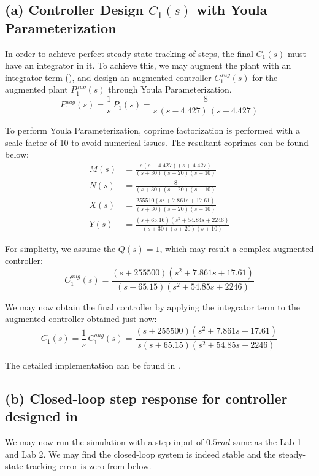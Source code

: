 \documentclass{tron}
\begin{document}
\subsection{(a) Controller Design $C_1(s)$ with Youla Parameterization \label{ans:P1-a}}
In order to achieve perfect steady-state tracking of steps, the final $C_1(s)$ must have an integrator in it. To achieve this, we may augment the plant with an integrator term (), and design an augmented controller $C_1^{aug}(s)$ for the augmented plant $P_1^{aug}(s)$ through Youla Parameterization.
\begin{equation}
\label{eqn:p1-aug}
	P_1^{aug}(s) = \frac1s \, P_1(s) = \frac{8}{s\,(s-4.427)\,(s+4.427)}
\end{equation}
 
To perform Youla Parameterization, coprime factorization is performed with a scale factor of 10 to avoid numerical issues. The resultant coprimes can be found below:
\begin{align}
	M(s)  &= \frac{s (s-4.427) (s+4.427) }{ (s+30) (s+20) (s+10)} \\
	N(s)  &= \frac{ 8 }{ (s+30) (s+20) (s+10)} \\
	X(s)  &= \frac{ 255510 (s^2 + 7.861s + 17.61)}{ (s+30) (s+20) (s+10)} \\
	Y(s)  &= \frac{ (s+65.16) (s^2 + 54.84s + 2246) }{ (s+30) (s+20) (s+10)}
\end{align}
 
 For simplicity, we assume the $Q(s) = 1$, which may result a complex augmented controller:
 \begin{equation}
 	C_1^{aug}(s) = \frac{(s+255500) (s^2 + 7.861s + 17.61) }{ (s+65.15) (s^2 + 54.85s + 2246)}
 \end{equation}
 
 We may now obtain the final controller by applying the integrator term to the augmented controller obtained just now:
 \begin{equation}
 	C_1(s) = \frac1s \, C_1^{aug}(s) = \frac{(s+255500) (s^2 + 7.861s + 17.61) }{ s (s+65.15) (s^2 + 54.85s + 2246)}
 \end{equation}
 
The detailed implementation can be found in .
 
 
\newpage
\subsection{(b) Closed-loop step response for controller designed in  \label{ans:P1-b}}
We may now run the simulation with a step input of $0.5 \unit{rad}$ same as the Lab 1 and Lab 2. We may find the closed-loop system is indeed stable and the steady-state tracking error is zero from  below.
\end{document}
